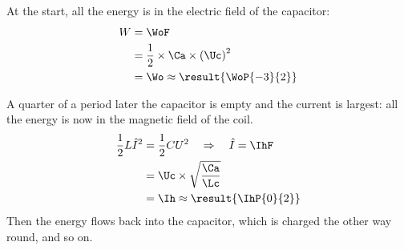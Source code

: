 \begin{abcliste}
\abc At the start, all the energy is in the electric field of the capacitor:
\begin{align}
 W &= \WoF \\
   &= \frac{1}{2}\times\Ca\times\left(\Uc\right)^2 \\
   &= \Wo \approx \result{\WoP{-3}{2}}
\end{align}

\abc A quarter of a period later the capacitor is empty and the current is largest: all the energy is now in the magnetic field of the coil.
\begin{align}
 \frac{1}{2}L\hat I^2 &= \frac{1}{2}C U^2 \quad\Rightarrow\quad \hat I = \IhF \\
   &= \Uc\times\sqrt{\frac{\Ca}{\Lc}} \\
   &= \Ih \approx \result{\IhP{0}{2}}
\end{align}
Then the energy flows back into the capacitor, which is charged the other way round, and so on.
\end{abcliste}

